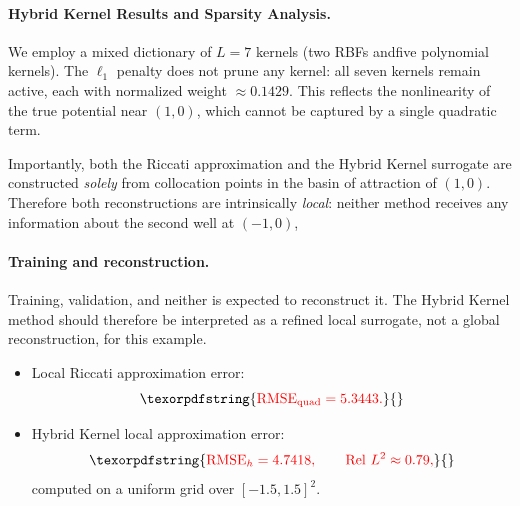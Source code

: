 \documentclass[11pt]{article}
\theoremstyle{plain}      %
\theoremstyle{definition} %
\providecommand{\DIFaddtex}[1]{{\protect\color{blue}#1}} %
\providecommand{\DIFdeltex}[1]{{\protect\color{red}#1}} %
\providecommand{\DIFaddbegin}{} %
\providecommand{\DIFaddend}{} %
\providecommand{\DIFdelbegin}{} %
\providecommand{\DIFdelend}{} %
\providecommand{\DIFadd}[1]{\texorpdfstring{\DIFaddtex{#1}}{#1}} %
\providecommand{\DIFdel}[1]{\texorpdfstring{\DIFdeltex{#1}}{}} %
\newcommand{\DIFscaledelfig}{1.0}
\newlength{\DIFdelgraphicswidth} %
\newlength{\DIFdelgraphicsheight} %
\newcommand{\DIFaddincludegraphics}[2][]{{\color{blue}\fbox{\DIFOincludegraphics[#1]{#2}}}} %
\newcommand{\DIFdelincludegraphics}[2][]{%
\sbox{\DIFdelgraphicsbox}{\DIFOincludegraphics[#1]{#2}}%
\settoboxwidth{\DIFdelgraphicswidth}{\DIFdelgraphicsbox} %
\settoboxtotalheight{\DIFdelgraphicsheight}{\DIFdelgraphicsbox} %
\scalebox{\DIFscaledelfig}{%
\parbox[b]{\DIFdelgraphicswidth}{\usebox{\DIFdelgraphicsbox}\\[-\baselineskip] \rule{\DIFdelgraphicswidth}{0em}}\llap{\resizebox{\DIFdelgraphicswidth}{\DIFdelgraphicsheight}{%
\setlength{\unitlength}{\DIFdelgraphicswidth}%
\begin{picture}(1,1)%
\thicklines\linethickness{2pt} %
{\color[rgb]{1,0,0}\put(0,0){\framebox(1,1){}}}%
{\color[rgb]{1,0,0}\put(0,0){\line( 1,1){1}}}%
{\color[rgb]{1,0,0}\put(0,1){\line(1,-1){1}}}%
\end{picture}%
}\hspace*{3pt}}} %
} %
\DeclareRobustCommand{\DIFaddbegin}{\DIFOaddbegin \let\includegraphics\DIFaddincludegraphics} %
\DeclareRobustCommand{\DIFaddend}{\DIFOaddend \let\includegraphics\DIFOincludegraphics} %
\DeclareRobustCommand{\DIFdelbegin}{\DIFOdelbegin \let\includegraphics\DIFdelincludegraphics} %
\DeclareRobustCommand{\DIFdelend}{\DIFOaddend \let\includegraphics\DIFOincludegraphics} %
\begin{document}
\DIFdelbegin \paragraph{\DIFdel{Hybrid Kernel Results and Sparsity Analysis.}}
\addtocounter{paragraph}{-1}%
\DIFdel{We employ a mixed dictionary of $L=7$ kernels (two RBFs andfive polynomial
kernels). The $\ell_1$ penalty does not prune any kernel: all seven kernels remain active,
each with normalized weight $\approx 0.1429$. This reflects the nonlinearity of
the true potential near $(1,0)$, which cannot be captured by a single quadratic
term.
}%

\DIFdel{Importantly, both the Riccati approximation and the Hybrid Kernel surrogate are
constructed \emph{solely} from collocation points in the basin of attraction of
$(1,0)$. Therefore both reconstructions are intrinsically \emph{local}:
neither method receives any information about the second well at $(-1,0)$, }\DIFdelend \DIFaddbegin \paragraph{\DIFadd{Training and reconstruction.}}
\DIFadd{Training, validation, }\DIFaddend and \DIFdelbegin \DIFdel{neither is expected to reconstruct it. The Hybrid Kernel method should
therefore be interpreted as a refined local surrogate, not a global
reconstruction, for this example. }%

\begin{itemize}%
\item%
\DIFdel{Local Riccati approximation error:
    }\[
      \DIFdel{\mathrm{RMSE}_{\rm quad}=5.3443.
    }\]%
\item%
\DIFdel{Hybrid Kernel local approximation error:
    }\[
      \DIFdel{\mathrm{RMSE}_{h}=4.7418,
      \qquad
      \mathrm{Rel\ }L^2 \approx 0.79,
    }\]%
\DIFdel{computed on a uniform grid over $[-1.5,1.5]^2$.
}
\end{itemize}%

\end{document}
